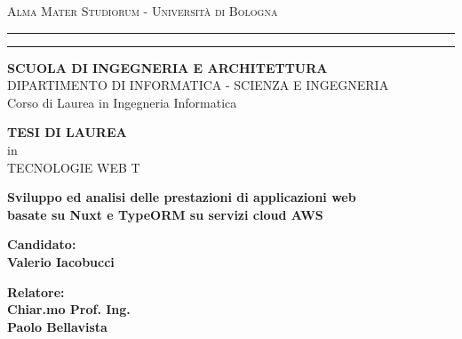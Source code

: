 \documentclass[11pt,a4paper]{report}
\begin{document}
\begin{titlepage}
	\begin{center}
	{{\Large{\textsc{Alma Mater Studiorum - Universit\`a di
	Bologna}}}} \rule[0.1cm]{15.8cm}{0.1mm}
	\rule[0.5cm]{15.8cm}{0.6mm}
	{\small{\bf SCUOLA DI INGEGNERIA E ARCHITETTURA}\\
	DIPARTIMENTO DI INFORMATICA - SCIENZA E INGEGNERIA\\
	Corso di Laurea in Ingegneria Informatica}
	\end{center}
	\vspace{15mm}
	\begin{center}
	{\large{\bf TESI DI LAUREA}}\\
	\vspace{2mm}
	{\large{in}}\\
	\vspace{2mm}
	{\large{TECNOLOGIE WEB T}}\\
	\end{center}
	\vspace{15mm}
	\begin{center}
	{\LARGE{\bf Sviluppo ed analisi delle prestazioni di applicazioni web}}\\
	\vspace{3mm}
	{\LARGE{\bf basate su Nuxt e TypeORM su servizi cloud AWS}}\\
	\end{center}
	\vspace{40mm}
	\par
	\noindent
	\begin{minipage}[t]{0.47\textwidth}
	{\large{\bf Candidato:\\
	Valerio Iacobucci}}
	\end{minipage}
	\hfill
	\begin{minipage}[t]{0.47\textwidth}\raggedleft
	{\large{\bf Relatore:\\
	Chiar.mo Prof. Ing.\\
	Paolo Bellavista}}
	\end{minipage}
	\vspace{20mm}
	\begin{center}
	\end{center}
\end{titlepage}

\shipout\null

\begingroup
	\hypersetup{linkcolor=black}
	\tableofcontents
\endgroup

\newpage
\end{document}
